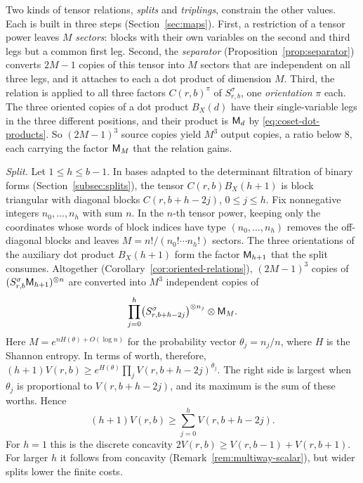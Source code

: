 Two kinds of tensor relations, \emph{splits} and \emph{triplings},
constrain the other values. Each is built in three steps
(Section~\ref{sec:maps}). First, a restriction of a tensor power
leaves \(M\) \emph{sectors}: blocks with their own variables on the
second and third legs but a common first leg. Second,
the \emph{separator} (Proposition~\ref{prop:separator}) converts \(2M-1\)
copies of this tensor into \(M\) sectors that are independent on all
three legs, and it attaches to each a dot product of dimension \(M\).
Third, the relation is applied to all three factors \(C(r,b)^\pi\) of
\(S^\sigma_{r,b}\), one \emph{orientation} \(\pi\) each. The three
oriented copies of a dot product \(B_X(d)\) have their single-variable
legs in the three different positions, and their product is \(\mathsf M_d\) by
\eqref{eq:coset-dot-products}. So \((2M-1)^3\) source copies yield
\(M^3\) output copies, a ratio below \(8\), each carrying the factor
\(\mathsf M_M\) that the relation gains.

\emph{Split.} Let \(1\le h\le b-1\). In bases adapted to the determinant
filtration of binary forms (Section~\ref{subsec:splits}), the tensor
\(C(r,b)B_X(h+1)\) is block triangular with diagonal blocks
\(C(r,b+h-2j)\), \(0\le j\le h\). Fix nonnegative integers
\(n_0,\ldots,n_h\) with sum \(n\). In the \(n\)-th tensor power, keeping
only the coordinates whose words of block indices have type
\((n_0,\ldots,n_h)\) removes the off-diagonal blocks and leaves
\(M=n!/(n_0!\cdots n_h!)\) sectors. The three orientations of the
auxiliary dot product \(B_X(h+1)\) form the factor \(\mathsf M_{h+1}\) that the
split consumes. Altogether (Corollary~\ref{cor:oriented-relations}),
\((2M-1)^3\) copies of \((S^\sigma_{r,b}\mathsf M_{h+1})^{\otimes n}\) are
converted into \(M^3\) independent copies of
\[
 \prod_{j=0}^h\bigl(S^\sigma_{r,b+h-2j}\bigr)^{\otimes n_j}\otimes\mathsf M_M .
\]
Here \(M=e^{nH(\theta)+O(\log n)}\) for the probability vector
\(\theta_j=n_j/n\), where \(H\) is the Shannon entropy. In terms of
worth, therefore,
\((h+1)V(r,b)\ge e^{H(\theta)}\prod_jV(r,b+h-2j)^{\theta_j}\). The right
side is largest when \(\theta_j\) is proportional to \(V(r,b+h-2j)\),
and its maximum is the sum of these worths. Hence
\begin{equation}\label{eq:intro-split}
 (h+1)V(r,b)\ge\sum_{j=0}^hV(r,b+h-2j).
\end{equation}
For \(h=1\) this is the discrete concavity
\(2V(r,b)\ge V(r,b-1)+V(r,b+1)\). For larger \(h\) it follows from
concavity (Remark~\ref{rem:multiway-scalar}), but wider splits lower the
finite costs.

